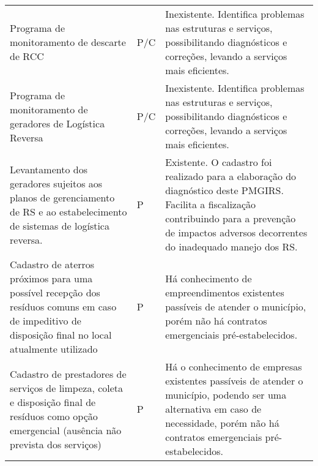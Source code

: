 \begin{table}[htbp]
\begin{tabular}{|P{15em}|P{7em}|P{22em}|}
		 Programa de monitoramento de descarte de RCC & P/C   & Inexistente. Identifica problemas nas estruturas e serviços, possibilitando diagnósticos e correções, levando a serviços mais eficientes. \\
		 Programa de monitoramento de geradores de Logística Reversa & P/C   & Inexistente. Identifica problemas nas estruturas e serviços, possibilitando diagnósticos e correções, levando a serviços mais eficientes. \\
		 Levantamento dos geradores sujeitos aos planos de gerenciamento de RS e ao estabelecimento de sistemas de logística reversa. & P     & Existente. O cadastro foi realizado para a elaboração do diagnóstico deste PMGIRS. Facilita a fiscalização contribuindo para a prevenção de impactos adversos decorrentes do inadequado manejo dos RS. \\
		 Cadastro de aterros próximos para uma possível recepção dos resíduos comuns em caso de impeditivo de disposição final no local atualmente utilizado & P     & Há conhecimento de empreendimentos existentes passíveis de atender o município, porém não há contratos emergenciais pré-estabelecidos. \\
		 Cadastro de prestadores de serviços de limpeza, coleta e disposição final de resíduos como opção emergencial (ausência não prevista dos serviços) & P     & Há o conhecimento de empresas existentes passíveis de atender o município, podendo ser uma alternativa em caso de necessidade, porém não há contratos emergenciais pré-estabelecidos. \\
	\end{tabular}%
	\label{tab:acoes_prevent}%
\end{table}%
